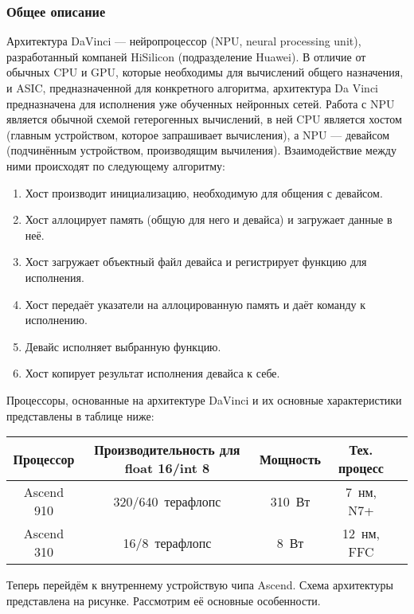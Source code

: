 \subsubsection{Общее описание}

Архитектура DaVinci --- нейропроцессор (NPU, neural processing unit),
разработанный компаней HiSilicon (подразделение Huawei). В отличие от
обычных CPU и GPU, которые необходимы для вычислений общего назначения,
и ASIC, предназначенной для конкретного алгоритма, архитектура Da Vinci
предназначена для исполнения уже обученных нейронных сетей. Работа с NPU
является обычной схемой гетерогенных вычислений, в ней CPU является хостом
(главным устройством, которое запрашивает вычисления), а NPU --- девайсом
(подчинённым устройством, производящим вычиления). Взаимодействие между ними
происходят по следующему алгоритму:

\begin{enumerate}
    \item Хост производит инициализацию, необходимую для общения с девайсом.
    \item Хост аллоцирует память (общую для него и девайса) и загружает данные в неё.
    \item Хост загружает объектный файл девайса и регистрирует функцию для исполнения.
    \item Хост передаёт указатели на аллоцированную память и даёт команду к исполнению.
    \item Девайс исполняет выбранную функцию.
    \item Хост копирует результат исполнения девайса к себе.
\end{enumerate}

Процессоры, основанные на архитектуре DaVinci и их основные характеристики
представлены в таблице ниже:

\begin{table}[h!]
    \centering
    \begin{tabular}{|c|c|c|c|c|}
        \hline
        Процессор & Производительность для float 16/int 8 & Мощность & Тех. процесс  \\ \hline
        Ascend 910 & 320/640~терафлопс & 310~Вт & 7~нм, N7+ \\ \hline
        Ascend 310 & 16/8~терафлопс & 8~Вт & 12~нм, FFC \\ \hline
    \end{tabular}
\end{table}

Теперь перейдём к внутреннему устройствую чипа Ascend. Схема архитектуры
представлена на рисунке. Рассмотрим её основные особенности.

